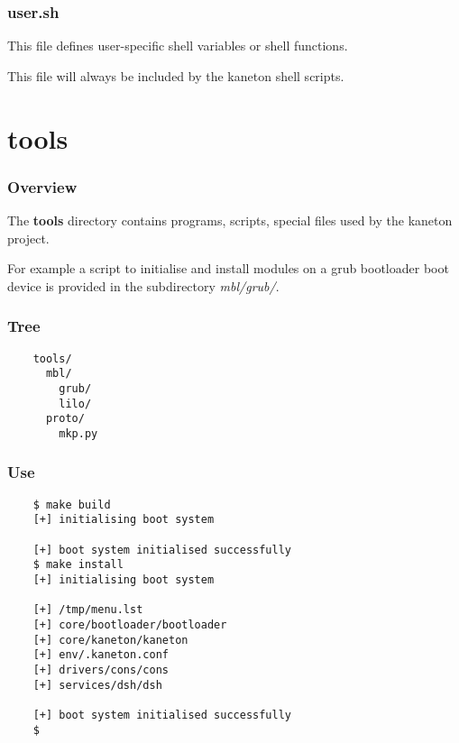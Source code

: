 
\begin{frame}
  \frametitle{user.sh}

  This file defines user-specific shell variables or shell functions.

  \nl

  This file will always be included by the kaneton shell scripts.
\end{frame}

%
%

\section{tools}


\begin{frame}
  \frametitle{Overview}

  The \textbf{tools} directory contains programs, scripts, special
  files used by the kaneton project.

  \nl

  For example a script to initialise and install modules on a grub
  bootloader boot device is provided in the subdirectory
  \textit{mbl/grub/}.
\end{frame}


\begin{frame}[containsverbatim]
  \frametitle{Tree}

  \begin{verbatim}
    tools/
      mbl/
        grub/
        lilo/
      proto/
        mkp.py
  \end{verbatim}
\end{frame}


\begin{frame}[containsverbatim]
  \frametitle{Use}

  \begin{verbatim}
    $ make build
    [+] initialising boot system

    [+] boot system initialised successfully
    $ make install
    [+] initialising boot system

    [+] /tmp/menu.lst
    [+] core/bootloader/bootloader
    [+] core/kaneton/kaneton
    [+] env/.kaneton.conf
    [+] drivers/cons/cons
    [+] services/dsh/dsh

    [+] boot system initialised successfully
    $
  \end{verbatim}
\end{frame}

